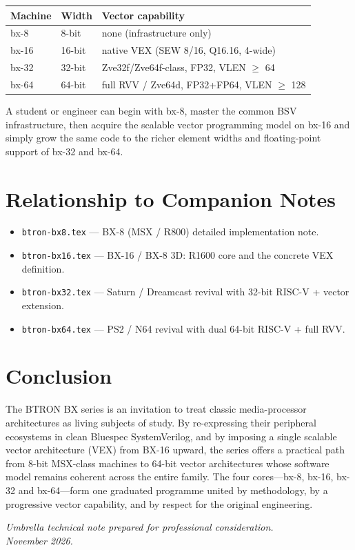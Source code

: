 \documentclass[11pt,a4paper]{article}
\begin{document}
\begin{center}
\begin{tabular}{@{}llp{6.2cm}@{}}
\toprule
\textbf{Machine} & \textbf{Width} & \textbf{Vector capability} \\
\midrule
bx-8  & 8-bit  & none (infrastructure only) \\
bx-16 & 16-bit & native VEX (SEW 8/16, Q16.16, 4-wide) \\
bx-32 & 32-bit & Zve32f/Zve64f-class, FP32, VLEN $\ge$ 64 \\
bx-64 & 64-bit & full RVV / Zve64d, FP32+FP64, VLEN $\ge$ 128 \\
\bottomrule
\end{tabular}
\end{center}

A student or engineer can begin with bx-8, master the common BSV infrastructure, then acquire the scalable vector programming model on bx-16 and simply grow the same code to the richer element widths and floating-point support of bx-32 and bx-64.

\section{Relationship to Companion Notes}

\begin{itemize}[leftmargin=1.5em]
  \item \texttt{btron-bx8.tex} --- BX-8 (MSX / R800) detailed implementation note.
  \item \texttt{btron-bx16.tex} --- BX-16 / BX-8 3D: R1600 core and the concrete VEX definition.
  \item \texttt{btron-bx32.tex} --- Saturn / Dreamcast revival with 32-bit RISC-V + vector extension.
  \item \texttt{btron-bx64.tex} --- PS2 / N64 revival with dual 64-bit RISC-V + full RVV.
\end{itemize}

\section{Conclusion}

The BTRON BX series is an invitation to treat classic media-processor architectures as living subjects of study. By re-expressing their peripheral ecosystems in clean Bluespec SystemVerilog, and by imposing a single scalable vector architecture (VEX) from BX-16 upward, the series offers a practical path from 8-bit MSX-class machines to 64-bit vector architectures whose software model remains coherent across the entire family. The four cores---bx-8, bx-16, bx-32 and bx-64---form one graduated programme united by methodology, by a progressive vector capability, and by respect for the original engineering.

\vspace{1.5em}
\noindent\textit{Umbrella technical note prepared for professional consideration.\\
November 2026.}
\end{document}
